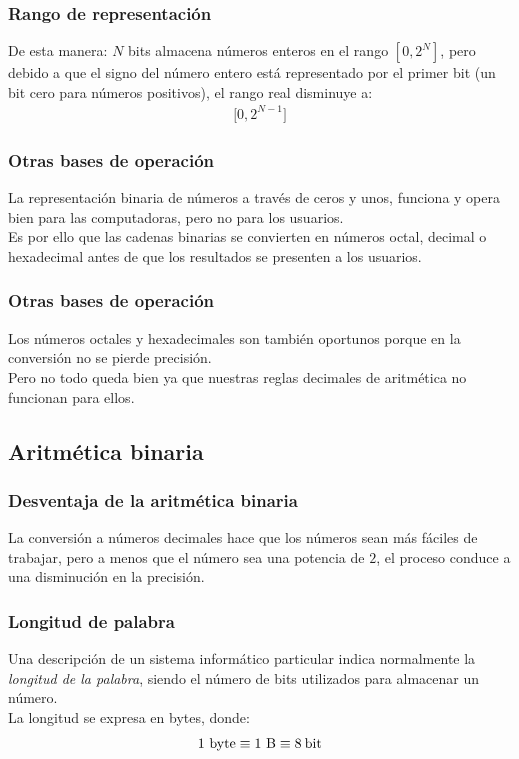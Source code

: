 \documentclass[12pt]{beamer}
\begin{document}
\begin{frame}
\frametitle{Rango de representación}
De esta manera: $N$ bits almacena números enteros en el rango $[0, 2^{N}]$, pero debido a que el signo del número entero está representado por el primer bit (un bit cero para números positivos), el rango real disminuye a:
\pause
\begin{align*}
\big[ 0, 2^{N- 1} \big]
\end{align*}
\end{frame}
\begin{frame}
\frametitle{Otras bases de operación}
La representación binaria de números a través de ceros y unos, funciona y opera bien para las computadoras, pero no para los usuarios.
\\
\bigskip
\pause
Es por ello que las cadenas binarias se convierten en números octal, decimal o hexadecimal antes de que los resultados se presenten a los usuarios.
\end{frame}
\begin{frame}
\frametitle{Otras bases de operación}
Los números octales y hexadecimales son también oportunos porque en la conversión no se pierde precisión.
\\
\bigskip
\pause
Pero no todo queda bien ya que nuestras reglas decimales de aritmética no funcionan para ellos.
\end{frame}

\subsection{Aritmética binaria}

\begin{frame}
\frametitle{Desventaja de la aritmética binaria}
La conversión a números decimales hace que los números sean más fáciles de trabajar, pero a menos que el número sea una potencia de $2$, el proceso conduce a una disminución en la precisión.
\end{frame}
\begin{frame}
\frametitle{Longitud de palabra}
Una descripción de un sistema informático particular indica normalmente la \emph{longitud de la palabra}, siendo el número de bits utilizados para almacenar un número.
\\
\bigskip
\pause
La longitud se expresa en bytes, donde:
\pause
\begin{align*}
1 \text{ byte} \equiv 1 \text{ B} \equiv 8 \: \si{\bit}
\end{align*}
\end{frame}
\end{document}
